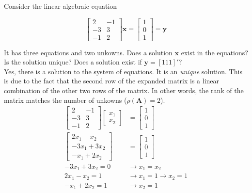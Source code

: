 \item [3.7] Consider the linear algebraic equation

\begin{equation*}
 \begin{bmatrix}
  2 & -1\\
  -3 & 3\\
  -1 & 2
 \end{bmatrix}
\mathbf{x} =
\begin{bmatrix}
 1\\
 0\\
 1
\end{bmatrix}
= \mathbf{y}
\end{equation*}

It has three equations and two unkowns.
Does a solution $\mathbf{x}$ exist in the equations?
Is the solution unique?
Does a solution exist if $\mathbf{y} = [1 1 1]'$?\\

Yes, there is a solution to the system of equations. It is
an \emph{unique} solution.
This is due to the fact that the
second row of the expanded matrix is a linear combination of
the other two rows of the matrix.
In other words, the rank of the matrix matches
the number of unkowns ($\rho(\mathbf{A}) = 2$).
\\

\begin{align*}
  \begin{bmatrix}
    2 & -1\\ -3 & 3\\-1 & 2
  \end{bmatrix}
  \begin{bmatrix}
   x_1 \\x_2
  \end{bmatrix}
    & =
    \begin{bmatrix}1\\  0\\  1\end{bmatrix}\\
    \begin{bmatrix}
    2 x_1 - x_2\\ -3 x_1 + 3 x_2\\-x_1 + 2 x_2
  \end{bmatrix} &= \begin{bmatrix}1\\  0\\  1\end{bmatrix}\\
  -3 x_1 + 3 x_2 = 0 & \rightarrow x_1 = x_2\\
  2 x_1 - x_2 = 1 & \rightarrow x_1 = 1 \rightarrow x_2 = 1\\
  - x_1 + 2 x_2 = 1 & \rightarrow x_2 = 1
\end{align*}

